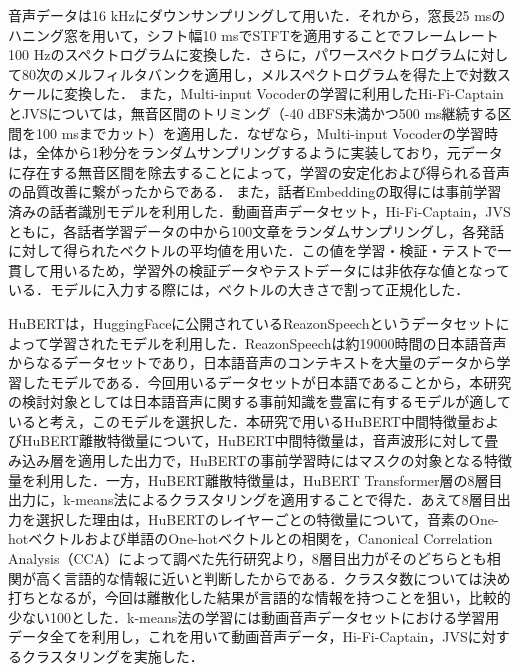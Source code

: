 \documentclass[12pt]{jarticle}
\numberwithin{equation}{section}    %
\numberwithin{figure}{section}      %
\numberwithin{table}{section}      %
\begin{document}
音声データは16 kHzにダウンサンプリングして用いた．それから，窓長25 msのハニング窓を用いて，シフト幅10 msでSTFTを適用することでフレームレート100 Hzのスペクトログラムに変換した．さらに，パワースペクトログラムに対して80次のメルフィルタバンクを適用し，メルスペクトログラムを得た上で対数スケールに変換した．
また，Multi-input Vocoderの学習に利用したHi-Fi-CaptainとJVSについては，無音区間のトリミング（-40 dBFS未満かつ500 ms継続する区間を100 msまでカット）を適用した．なぜなら，Multi-input Vocoderの学習時は，全体から1秒分をランダムサンプリングするように実装しており，元データに存在する無音区間を除去することによって，学習の安定化および得られる音声の品質改善に繋がったからである．
また，話者Embeddingの取得には事前学習済みの話者識別モデル\cite{wan2018generalized}を利用した．動画音声データセット，Hi-Fi-Captain，JVSともに，各話者学習データの中から100文章をランダムサンプリングし，各発話に対して得られたベクトルの平均値を用いた．この値を学習・検証・テストで一貫して用いるため，学習外の検証データやテストデータには非依存な値となっている．モデルに入力する際には，ベクトルの大きさで割って正規化した．

HuBERTは，HuggingFaceに公開されているReazonSpeechというデータセットによって学習されたモデル\cite{rinna-japanese-hubert-base,sawada2024release}を利用した．ReazonSpeechは約19000時間の日本語音声からなるデータセットであり，日本語音声のコンテキストを大量のデータから学習したモデルである．今回用いるデータセットが日本語であることから，本研究の検討対象としては日本語音声に関する事前知識を豊富に有するモデルが適していると考え，このモデルを選択した．本研究で用いるHuBERT中間特徴量およびHuBERT離散特徴量について，HuBERT中間特徴量は，音声波形に対して畳み込み層を適用した出力で，HuBERTの事前学習時にはマスクの対象となる特徴量を利用した．一方，HuBERT離散特徴量は，HuBERT Transformer層の8層目出力に，k-means法によるクラスタリングを適用することで得た．あえて8層目出力を選択した理由は，HuBERTのレイヤーごとの特徴量について，音素のOne-hotベクトルおよび単語のOne-hotベクトルとの相関を，Canonical Correlation Analysis（CCA）によって調べた先行研究\cite{pasad2023comparative}より，8層目出力がそのどちらとも相関が高く言語的な情報に近いと判断したからである．クラスタ数については決め打ちとなるが，今回は離散化した結果が言語的な情報を持つことを狙い，比較的少ない100とした．k-means法の学習には動画音声データセットにおける学習用データ全てを利用し，これを用いて動画音声データ，Hi-Fi-Captain，JVSに対するクラスタリングを実施した．
\end{document}
